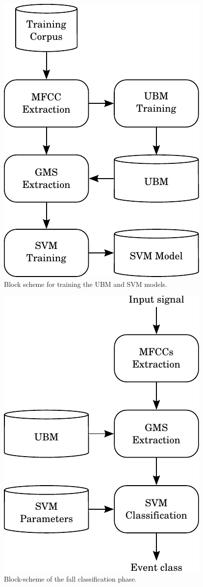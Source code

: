 \begin{figure}[t]
	\centering
	\includegraphics[width=0.3334\columnwidth]{img/training_scheme.pdf}
	\caption{Block scheme for training the UBM and SVM models.}
	\label{fig:training-scheme}
\end{figure}

\begin{figure}[t]
	\centering
	\includegraphics[width=0.333\columnwidth]{img/scheme_classify_bn.pdf}
	\caption{Block-scheme of the fall classification phase.}
	\label{fig:scheme-classify-color}
\end{figure}

%

